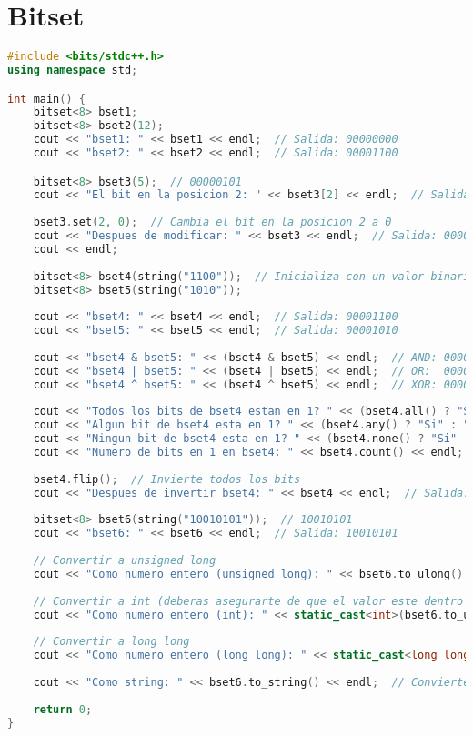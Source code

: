 
\section*{Bitset}

\begin{lstlisting}[language=C++]
#include <bits/stdc++.h>
using namespace std; 

int main() {
	bitset<8> bset1;  
	bitset<8> bset2(12); 
	cout << "bset1: " << bset1 << endl;  // Salida: 00000000
	cout << "bset2: " << bset2 << endl;  // Salida: 00001100

	bitset<8> bset3(5);  // 00000101
	cout << "El bit en la posicion 2: " << bset3[2] << endl;  // Salida: 1
	
	bset3.set(2, 0);  // Cambia el bit en la posicion 2 a 0
	cout << "Despues de modificar: " << bset3 << endl;  // Salida: 00000001
	cout << endl;
	
	bitset<8> bset4(string("1100"));  // Inicializa con un valor binario dado como string
	bitset<8> bset5(string("1010"));  
	
	cout << "bset4: " << bset4 << endl;  // Salida: 00001100
	cout << "bset5: " << bset5 << endl;  // Salida: 00001010
	
	cout << "bset4 & bset5: " << (bset4 & bset5) << endl;  // AND: 00001000
	cout << "bset4 | bset5: " << (bset4 | bset5) << endl;  // OR:  00001110
	cout << "bset4 ^ bset5: " << (bset4 ^ bset5) << endl;  // XOR: 00000110
	
	cout << "Todos los bits de bset4 estan en 1? " << (bset4.all() ? "Si" : "No") << endl;  // No
	cout << "Algun bit de bset4 esta en 1? " << (bset4.any() ? "Si" : "No") << endl;  // Si
	cout << "Ningun bit de bset4 esta en 1? " << (bset4.none() ? "Si" : "No") << endl;  // No
	cout << "Numero de bits en 1 en bset4: " << bset4.count() << endl;  // 2
	
	bset4.flip();  // Invierte todos los bits
	cout << "Despues de invertir bset4: " << bset4 << endl;  // Salida: 11110011
	
	bitset<8> bset6(string("10010101"));  // 10010101
	cout << "bset6: " << bset6 << endl;  // Salida: 10010101
	
	// Convertir a unsigned long
	cout << "Como numero entero (unsigned long): " << bset6.to_ulong() << endl;  // Convierte a unsigned long: 149
	
	// Convertir a int (deberas asegurarte de que el valor este dentro del rango de int)
	cout << "Como numero entero (int): " << static_cast<int>(bset6.to_ulong()) << endl;  // Convierte a int: 149
	
	// Convertir a long long
	cout << "Como numero entero (long long): " << static_cast<long long>(bset6.to_ulong()) << endl;  // Convierte a long long: 149
	
	cout << "Como string: " << bset6.to_string() << endl;  // Convierte a string: "10010101"
	
	return 0;
}


\end{lstlisting}
